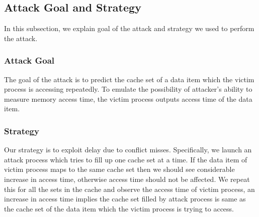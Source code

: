 \documentclass[twocolumn]{IEEEtran}
\begin{document}
\subsection {Attack Goal and Strategy}
In this subsection, we explain goal of the attack and strategy we used to perform the attack.
\subsubsection {Attack Goal}
The goal of the attack is to predict the cache set of a data item which the victim process is accessing repeatedly. To emulate the possibility of attacker's ability to measure memory access time, the victim process outputs access time of the data item.
\subsubsection {Strategy}
Our strategy is to exploit delay due to conflict misses. Specifically, we launch an attack process which tries to fill up one cache set at a time. If the data item of victim process maps to the same cache set then we should see considerable increase in access time, otherwise access time should not be affected. We repeat this for all the sets in the cache and observe the access time of victim process, an increase in access time implies the cache set filled by attack process is same as the cache set of the data item which the victim process is trying to access.
\end{document}
